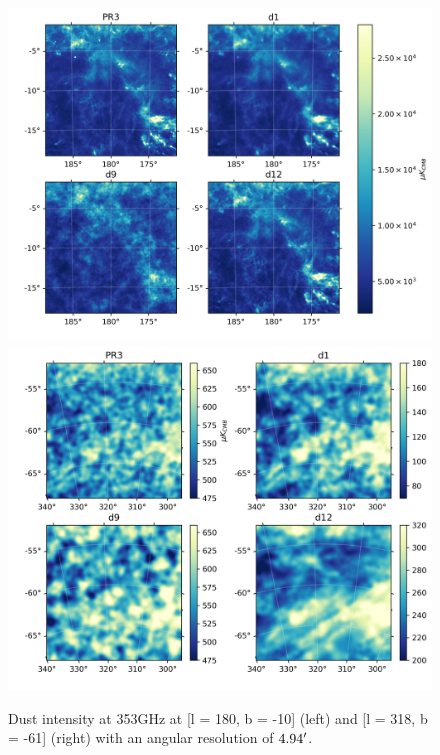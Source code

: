 \documentclass[twocolumn]{aastex631}
\begin{document}
\begin{figure}[t!]
    \centering
    \includegraphics[height=0.395\textwidth]{figures/I_gal_plane.png}
    \includegraphics[height=0.395\textwidth]{figures/I_BK.png}
\caption{Dust intensity at 353GHz at [l = 180, b = -10] (left) and [l = 318, b = -61] (right) with an angular resolution of $4.94\mbox{$^\prime$}$.}    
\label{fig:353_int}
\end{figure}
\end{document}
